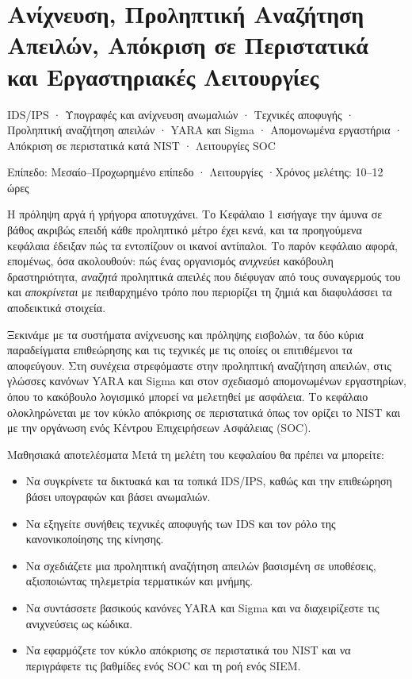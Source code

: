 \documentclass[11pt,openany]{book}
\newcommand{\chaptermeta}[3]{%
  {\sffamily\small\color{accent}#1\par}\vspace{0.3em}
  {\sffamily\footnotesize\color{gray}#2 \quad·\quad #3\par}\vspace{1.2em}}
\begin{document}
\chapter{Ανίχνευση, Προληπτική Αναζήτηση Απειλών, Απόκριση σε Περιστατικά και Εργαστηριακές Λειτουργίες}\label{ch:11}
\chaptermeta{IDS/IPS · Υπογραφές και ανίχνευση ανωμαλιών · Τεχνικές αποφυγής · Προληπτική αναζήτηση απειλών · YARA και Sigma · Απομονωμένα εργαστήρια · Απόκριση σε περιστατικά κατά NIST · Λειτουργίες SOC}{Επίπεδο: Μεσαίο–Προχωρημένο επίπεδο · Λειτουργίες}{Χρόνος μελέτης: 10–12 ώρες}

Η πρόληψη αργά ή γρήγορα αποτυγχάνει. Το Κεφάλαιο 1 εισήγαγε την άμυνα σε βάθος ακριβώς επειδή κάθε προληπτικό μέτρο έχει κενά, και τα προηγούμενα κεφάλαια έδειξαν πώς τα εντοπίζουν οι ικανοί αντίπαλοι. Το παρόν κεφάλαιο αφορά, επομένως, όσα ακολουθούν: πώς ένας οργανισμός \emph{ανιχνεύει} κακόβουλη δραστηριότητα, \emph{αναζητά} προληπτικά απειλές που διέφυγαν από τους συναγερμούς του και \emph{αποκρίνεται} με πειθαρχημένο τρόπο που περιορίζει τη ζημιά και διαφυλάσσει τα αποδεικτικά στοιχεία.

Ξεκινάμε με τα συστήματα ανίχνευσης και πρόληψης εισβολών, τα δύο κύρια παραδείγματα επιθεώρησης και τις τεχνικές με τις οποίες οι επιτιθέμενοι τα αποφεύγουν. Στη συνέχεια στρεφόμαστε στην προληπτική αναζήτηση απειλών, στις γλώσσες κανόνων YARA και Sigma και στον σχεδιασμό απομονωμένων εργαστηρίων, όπου το κακόβουλο λογισμικό μπορεί να μελετηθεί με ασφάλεια. Το κεφάλαιο ολοκληρώνεται με τον κύκλο απόκρισης σε περιστατικά όπως τον ορίζει το NIST και με την οργάνωση ενός Κέντρου Επιχειρήσεων Ασφάλειας (SOC).

\begin{outcomesbox}{Μαθησιακά αποτελέσματα}
Μετά τη μελέτη του κεφαλαίου θα πρέπει να μπορείτε:
\begin{itemize}
  \item Να συγκρίνετε τα δικτυακά και τα τοπικά IDS/IPS, καθώς και την επιθεώρηση βάσει υπογραφών και βάσει ανωμαλιών.
  \item Να εξηγείτε συνήθεις τεχνικές αποφυγής των IDS και τον ρόλο της κανονικοποίησης της κίνησης.
  \item Να σχεδιάζετε μια προληπτική αναζήτηση απειλών βασισμένη σε υποθέσεις, αξιοποιώντας τηλεμετρία τερματικών και μνήμης.
  \item Να συντάσσετε βασικούς κανόνες YARA και Sigma και να διαχειρίζεστε τις ανιχνεύσεις ως κώδικα.
  \item Να εφαρμόζετε τον κύκλο απόκρισης σε περιστατικά του NIST και να περιγράφετε τις βαθμίδες ενός SOC και τη ροή ενός SIEM.
\end{itemize}
\end{outcomesbox}
\end{document}
